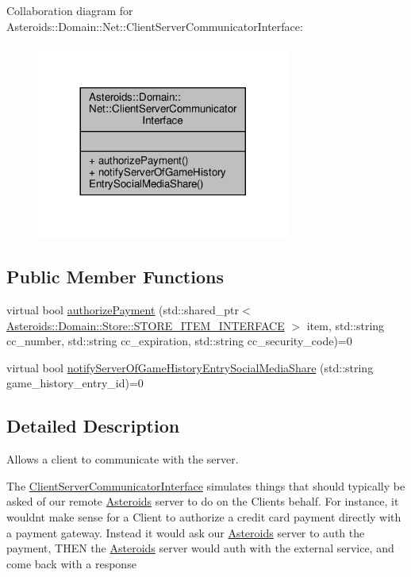Collaboration diagram for Asteroids\+:\+:Domain\+:\+:Net\+:\+:Client\+Server\+Communicator\+Interface\+:\nopagebreak
\begin{figure}[H]
\begin{center}
\leavevmode
\includegraphics[width=236pt]{classAsteroids_1_1Domain_1_1Net_1_1ClientServerCommunicatorInterface__coll__graph}
\end{center}
\end{figure}
\subsection*{Public Member Functions}
\begin{DoxyCompactItemize}
\item 
virtual bool \hyperlink{classAsteroids_1_1Domain_1_1Net_1_1ClientServerCommunicatorInterface_a02e01e493689e98bf44aa9a40feee063}{authorize\+Payment} (std\+::shared\+\_\+ptr$<$ \hyperlink{classAsteroids_1_1Domain_1_1Store_1_1STORE__ITEM__INTERFACE}{Asteroids\+::\+Domain\+::\+Store\+::\+S\+T\+O\+R\+E\+\_\+\+I\+T\+E\+M\+\_\+\+I\+N\+T\+E\+R\+F\+A\+CE} $>$ item, std\+::string cc\+\_\+number, std\+::string cc\+\_\+expiration, std\+::string cc\+\_\+security\+\_\+code)=0
\item 
virtual bool \hyperlink{classAsteroids_1_1Domain_1_1Net_1_1ClientServerCommunicatorInterface_a99c8f2baa739330f44096da950a1d145}{notify\+Server\+Of\+Game\+History\+Entry\+Social\+Media\+Share} (std\+::string game\+\_\+history\+\_\+entry\+\_\+id)=0
\end{DoxyCompactItemize}


\subsection{Detailed Description}
Allows a client to communicate with the server. 

The \hyperlink{classAsteroids_1_1Domain_1_1Net_1_1ClientServerCommunicatorInterface}{Client\+Server\+Communicator\+Interface} simulates things that should typically be asked of our remote \hyperlink{namespaceAsteroids}{Asteroids} server to do on the Client\textquotesingle{}s behalf. For instance, it wouldn\textquotesingle{}t make sense for a Client to authorize a credit card payment directly with a payment gateway. Instead it would ask our \hyperlink{namespaceAsteroids}{Asteroids} server to auth the payment, T\+H\+EN the \hyperlink{namespaceAsteroids}{Asteroids} server would auth with the external service, and come back with a response 

